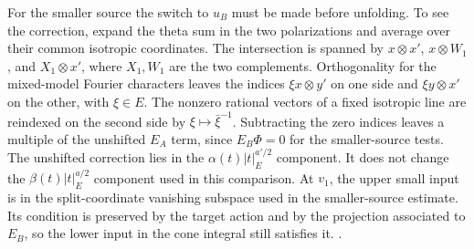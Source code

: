 For the smaller source the switch to \(u_B\) must be made before
unfolding. To see the correction, expand the theta sum in the two
polarizations and average over their common isotropic coordinates. The
intersection is spanned by \(x\otimes x'\), \(x\otimes W_1\), and
\(X_1\otimes x'\), where \(X_1,W_1\) are the two complements.
Orthogonality for the mixed-model Fourier characters leaves the
indices \(\xi x\otimes y'\) on one side and \(\xi y\otimes x'\)
on the other, with \(\xi\in E\). The nonzero rational vectors of a
fixed isotropic line are reindexed on the second side by
\(\xi\mapsto\bar\xi^{-1}\). Subtracting the zero indices leaves a
multiple of the unshifted \(E_A\) term, since \(E_B\Phi=0\) for the
smaller-source tests. The unshifted correction lies in the
\(\alpha(t)|t|_E^{a'/2}\) component. It does not change the
\(\beta(t)|t|_E^{a/2}\) component used in this comparison.
At \(v_1\), the upper small input is in the split-coordinate vanishing
subspace used in the smaller-source estimate. Its condition is
preserved by the target action and by the projection associated to
\(E_B\), so the lower input in the cone integral still satisfies it.
.

